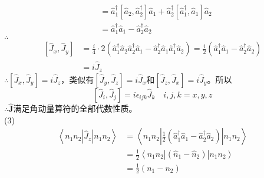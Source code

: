 \documentclass[12pt]{article}
\numberwithin{equation}{section}	 %
\begin{document}
\begin{spacing}{1.5}
\begin{equation}
\begin{aligned}
&= \hat{a}^{\dagger}_{1}\left[ \hat{a}_{2},\hat{a}^{\dagger}_{2} \right]\hat{a}_{1} + \hat{a}^{\dagger}_{2}\left[ \hat{a}^{\dagger}_{1},\hat{a}_{1} \right]\hat{a}_{2} \\
&= \hat{a}^{\dagger}_{1}\hat{a}_{1} - \hat{a}^{\dagger}_{2}\hat{a}_{2}
\end{aligned}
\end{equation}
$\therefore$\\
\begin{equation}
\begin{aligned}
\left[ \hat{J}_{x},\hat{J}_{y} \right] &= \frac{i}{4} \cdot 2 \left( \hat{a}^{\dagger}_{1}\hat{a}_{2}\hat{a}^{\dagger}_{2}\hat{a}_{1} - \hat{a}^{\dagger}_{2}\hat{a}_{1}\hat{a}^{\dagger}_{1}\hat{a}_{2} \right) =\frac{i}{2} \left(\hat{a}^{\dagger}_{1}\hat{a}_{1} - \hat{a}^{\dagger}_{2}\hat{a}_{2}\right)\\
&= i\hat{J}_{z}
\end{aligned}
\end{equation}
$\therefore \left[ \hat{J}_{x},\hat{J}_{y} \right] = i\hat{J}_{z}$，类似有$\left[ \hat{J}_{y},\hat{J}_{z} \right] = i\hat{J}_{x}$和$\left[ \hat{J}_{z},\hat{J}_{x} \right] = i\hat{J}_{y}$。所以
\begin{equation}\nonumber 		%
\left[ \hat{J}_{i},\hat{J}_{j} \right] = i\epsilon_{ijk}\hat{J}_{k} \quad i,j,k=x,y,z
\end{equation}
$\therefore \hat{\bm{J}}$满足角动量算符的全部代数性质。\\
(3)
\begin{equation}
\begin{aligned}
\left<n_{1}n_{2}\left| \hat{J}_{z} \right|n_{1}n_{2}\right> &= \left<n_{1}n_{2}\left| \frac{1}{2} \left(\hat{a}^{\dagger}_{1}\hat{a}_{1} - \hat{a}^{\dagger}_{2}\hat{a}_{2}\right) \right|n_{1}n_{2}\right> \\
&= \frac{1}{2} \left<n_{1}n_{2}\left| \left(\hat{n}_{1}-\hat{n}_{2}\right) \right|n_{1}n_{2}\right> \\
&= \frac{1}{2} \left(n_{1}-n_{2}\right)
\end{aligned}
\end{equation}


\end{spacing}
\end{document}
